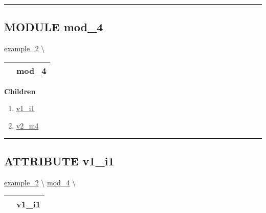 \par


\rule{\linewidth}{0.5pt}


\subsection*{\textsf{\colorbox{headtoc}{\color{white} MODULE}
mod\_4}}

\hypertarget{ecldoc:intest.example_2.mod_4}{}
\hspace{0pt} \hyperlink{ecldoc:intest.example_2}{example_2} \textbackslash 

{\renewcommand{\arraystretch}{1.5}
\begin{tabularx}{\textwidth}{|>{\raggedright\arraybackslash}l|X|}
\hline
\hspace{0pt}\mytexttt{\color{red} } & \textbf{mod\_4} \\
\hline
\end{tabularx}
}

\par


\textbf{Children}
\begin{enumerate}
\item \hyperlink{ecldoc:intest.example_2.mod_4.v1_i1}{v1\_i1}
\item \hyperlink{ecldoc:intest.example_2.mod_4.v2_m4}{v2\_m4}
\end{enumerate}

\rule{\linewidth}{0.5pt}

\subsection*{\textsf{\colorbox{headtoc}{\color{white} ATTRIBUTE}
v1\_i1}}

\hypertarget{ecldoc:intest.example_2.mod_4.v1_i1}{}
\hspace{0pt} \hyperlink{ecldoc:intest.example_2}{example_2} \textbackslash 
\hspace{0pt} \hyperlink{ecldoc:intest.example_2.mod_4}{mod_4} \textbackslash 

{\renewcommand{\arraystretch}{1.5}
\begin{tabularx}{\textwidth}{|>{\raggedright\arraybackslash}l|X|}
\hline
\hspace{0pt}\mytexttt{\color{red} } & \textbf{v1\_i1} \\
\hline
\end{tabularx}
}

\par

